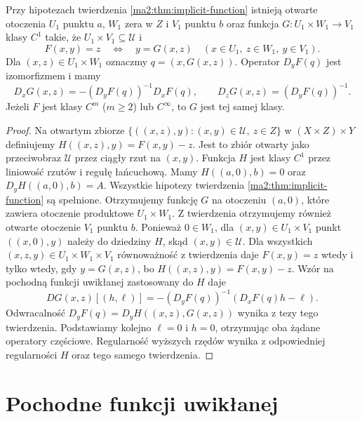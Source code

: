 \begin{stwierdzenie}
\label{ma2:prop:implicit-parameter}
Przy hipotezach twierdzenia \ref{ma2:thm:implicit-function}
istnieją otwarte otoczenia $U_1$ punktu $a$, $W_1$ zera w $Z$
i $V_1$ punktu $b$ oraz funkcja
$G:U_1\times W_1\to V_1$ klasy $C^1$ takie, że
$U_1\times V_1\subseteq\mathcal U$ i
\[
 F(x,y)=z\quad\Longleftrightarrow\quad y=G(x,z)
 \quad(x\in U_1,\ z\in W_1,\ y\in V_1).
\]
Dla $(x,z)\in U_1\times W_1$ oznaczmy $q=(x,G(x,z))$.
Operator $D_yF(q)$ jest izomorfizmem i mamy
\[
 D_xG(x,z)=-(D_yF(q))^{-1}D_xF(q),\qquad
 D_zG(x,z)=(D_yF(q))^{-1}.
\]
Jeżeli $F$ jest klasy $C^m$ ($m\ge2$) lub $C^\infty$,
to $G$ jest tej samej klasy.
\end{stwierdzenie}
\begin{proof}
Na otwartym zbiorze
$\{((x,z),y):(x,y)\in\mathcal U,\ z\in Z\}$
w $(X\times Z)\times Y$ definiujemy
$H((x,z),y)=F(x,y)-z$. Jest to zbiór otwarty jako
przeciwobraz $\mathcal U$ przez ciągły rzut na $(x,y)$.
Funkcja $H$ jest klasy $C^1$ przez liniowość rzutów i
regułę łańcuchową. Mamy $H((a,0),b)=0$ oraz
$D_yH((a,0),b)=A$. Wszystkie hipotezy twierdzenia
\ref{ma2:thm:implicit-function} są spełnione.
Otrzymujemy funkcję $G$ na otoczeniu $(a,0)$,
które zawiera otoczenie produktowe $U_1\times W_1$.
Z twierdzenia otrzymujemy również otwarte otoczenie
$V_1$ punktu $b$. Ponieważ $0\in W_1$, dla
$(x,y)\in U_1\times V_1$ punkt $((x,0),y)$ należy
do dziedziny $H$, skąd $(x,y)\in\mathcal U$.
Dla wszystkich $(x,z,y)\in U_1\times W_1\times V_1$
równoważność z twierdzenia daje
$F(x,y)=z$ wtedy i tylko wtedy, gdy $y=G(x,z)$,
bo $H((x,z),y)=F(x,y)-z$.
Wzór na pochodną funkcji uwikłanej zastosowany do $H$
daje
\[
 DG(x,z)[(h,\ell)]=-(D_yF(q))^{-1}(D_xF(q)h-\ell).
\]
Odwracalność $D_yF(q)=D_yH((x,z),G(x,z))$
wynika z tezy tego twierdzenia. Podstawiamy kolejno
$\ell=0$ i $h=0$, otrzymując oba żądane operatory
częściowe. Regularność
wyższych rzędów wynika z odpowiedniej regularności $H$
oraz tego samego twierdzenia.
\end{proof}

\section{Pochodne funkcji uwikłanej}


